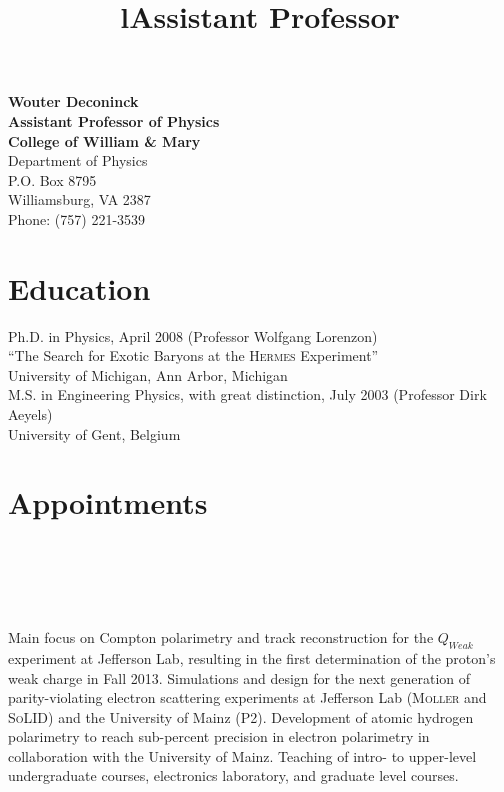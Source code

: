 \documentclass[overlapped,line,final,11pt,letterpaper]{res}
\begin{document}
\address{\href{mailto:Wouter Deconinck <wdeconinck@wm.edu>}{\texttt{wdeconinck@wm.edu}}}

\begin{resume}
{\bf Wouter Deconinck} \\
{\bf Assistant Professor of Physics} \\
{\bf College of William \& Mary} \\
Department of Physics \\
P.O. Box 8795         \\
Williamsburg, VA 2387 \\
Phone: (757) 221-3539 \\


\section{\bf Education}

Ph.D. in Physics, April 2008 (Professor Wolfgang Lorenzon)\\
``The Search for Exotic Baryons at the \textsc{Hermes} Experiment'' \\
University of Michigan, Ann Arbor, Michigan
\vspace{0.5\baselineskip} \\
M.S. in Engineering Physics, with great distinction, July 2003 (Professor Dirk Aeyels) \\
University of Gent, Belgium


\section{\bf Appointments}

\begin{format}
\\
\title{l}\\
\body\\
\end{format}

\title{Assistant Professor}
\begin{position}
  Main focus on Compton polarimetry and track reconstruction for the $Q_{Weak}$ experiment at Jefferson Lab, resulting in the first determination of the proton's weak charge in Fall 2013.  Simulations and design for the next generation of parity-violating electron scattering experiments at Jefferson Lab (\textsc{Moller} and \textsc{SoLID}) and the University of Mainz (P2).  Development of atomic hydrogen polarimetry to reach sub-percent precision in electron polarimetry in collaboration with the University of Mainz.  Teaching of intro- to upper-level undergraduate courses, electronics laboratory, and graduate level courses.
\end{position}


\end{resume}
\end{document}
